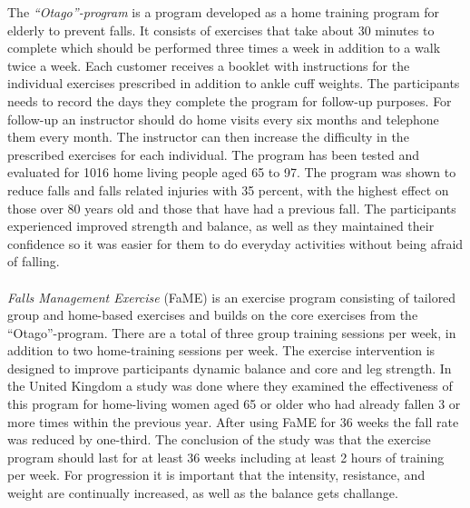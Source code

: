 The \emph{“Otago”-program} is a program developed as a home training program for elderly to prevent falls. It consists of exercises that take about 30 minutes to complete which should be performed three times a week in addition to a walk twice a week. Each customer receives a booklet with instructions for the individual exercises prescribed in addition to ankle cuff weights. The participants needs to record the days they complete the program for follow-up purposes. For follow-up an instructor should do home visits every six months and telephone them every month. The instructor can then increase the difficulty in the prescribed exercises for each individual. The program has been tested and evaluated for 1016 home living people aged 65 to 97. The program was shown to reduce falls and falls related injuries with 35 percent, with the highest effect on those over 80 years old and those that have had a previous fall. The participants experienced improved strength and balance, as well as they maintained their confidence so it was easier for them to do everyday activities without being afraid of falling. \cite{otago} \cite{gruppetrening-trheim}\\ \\
\emph{Falls Management Exercise} (FaME) is an exercise program consisting of tailored group and home-based exercises and builds on the core exercises from the “Otago”-program.  There are a total of three group training sessions per week, in addition to two home-training sessions per week. The exercise intervention is designed to improve participants dynamic balance and core and leg strength.  In the United Kingdom a study was done where they examined the effectiveness of this program for home-living women aged 65 or older who had already fallen 3 or more times within the previous year. After using FaME for 36 weeks the fall rate was reduced by one-third. The conclusion of the study was that the exercise program should last for at least 36 weeks including at least 2 hours of training per week. For progression it is important that the intensity, resistance, and weight are continually increased, as well as the balance gets challange.\cite{fame}\\ \\

